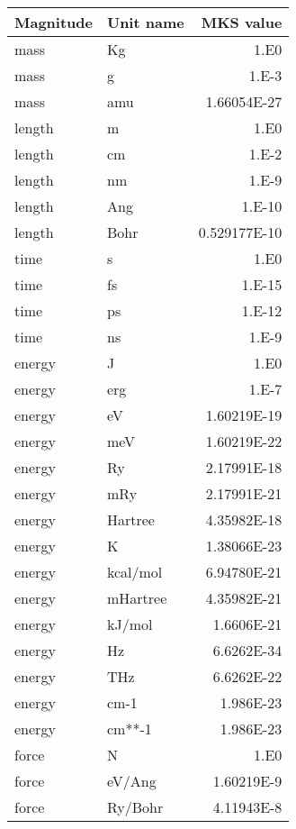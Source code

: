 \documentclass[11pt]{article}
\begin{document}
\begin{center}
\begin{tabular}{llr}
Magnitude & Unit name & MKS value \\
\hline  
mass     & Kg         & 1.E0 \\
mass     & g          & 1.E-3 \\
mass     & amu        & 1.66054E-27 \\
length   & m          & 1.E0 \\
length   & cm         & 1.E-2 \\
length   & nm         & 1.E-9 \\
length   & Ang        & 1.E-10 \\
length   & Bohr       & 0.529177E-10 \\
time     & s          & 1.E0 \\
time     & fs         & 1.E-15 \\
time     & ps         & 1.E-12 \\
time     & ns         & 1.E-9 \\
energy   & J          & 1.E0 \\
energy   & erg        & 1.E-7 \\
energy   & eV         & 1.60219E-19 \\
energy   & meV        & 1.60219E-22 \\
energy   & Ry         & 2.17991E-18 \\
energy   & mRy        & 2.17991E-21 \\
energy   & Hartree    & 4.35982E-18 \\
energy   & K          & 1.38066E-23 \\
energy   & kcal/mol   & 6.94780E-21 \\
energy   & mHartree   & 4.35982E-21 \\
energy   & kJ/mol     & 1.6606E-21 \\
energy   & Hz         & 6.6262E-34 \\
energy   & THz        & 6.6262E-22 \\
energy   & cm-1       & 1.986E-23 \\
energy   & cm**-1     & 1.986E-23 \\
force    & N          & 1.E0 \\
force    & eV/Ang     & 1.60219E-9 \\
force    & Ry/Bohr    & 4.11943E-8 \\
\hline
\end{tabular}


\end{center}
\end{document}

